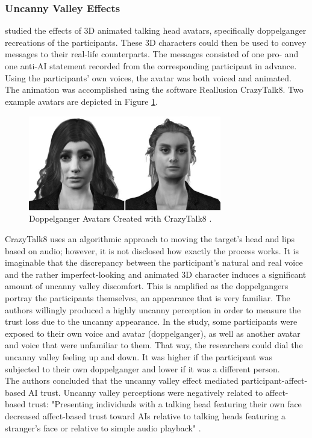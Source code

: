 \documentclass[
  a4paper,  %
  twoside,  %
  bibliography=totoc,
  headsepline,
  cleardoublepage=empty,
  parskip=half,
  draft=false
]{scrbook}
\begin{document}
\subsubsection*{Uncanny Valley Effects}
 studied the effects of 3D animated talking head avatars, specifically doppelganger recreations of the participants. These 3D characters could then be used to convey messages to their real-life counterparts. The messages consisted of one pro- and one anti-AI statement recorded from the corresponding participant in advance. Using the participants' own voices, the avatar was both voiced and animated. The animation was accomplished using the software Reallusion CrazyTalk8. Two example avatars are depicted in Figure \ref{fig:uncanny-avatars}.

\begin{figure}[h]
  \centering
  \includegraphics[width=0.75\textwidth]{./graphics/uncanny-avatars.png}
  \caption{Doppelganger Avatars Created with CrazyTalk8 \cite{weismanFaceUncannyEffects2021}.}
  \label{fig:uncanny-avatars}
\end{figure}

CrazyTalk8 uses an algorithmic approach to moving the target's head and lips based on audio; however, it is not disclosed how exactly the process works. It is imaginable that the discrepancy between the participant's natural and real voice and the rather imperfect-looking and animated 3D character induces a significant amount of uncanny valley discomfort. This is amplified as the doppelgangers portray the participants themselves, an appearance that is very familiar. The authors willingly produced a highly uncanny perception in order to measure the trust loss due to the uncanny appearance. In the study, some participants were exposed to their own voice and avatar (doppelganger), as well as another avatar and voice that were unfamiliar to them. That way, the researchers could dial the uncanny valley feeling up and down. It was higher if the participant was subjected to their own doppelganger and lower if it was a different person.\\
The authors concluded that the uncanny valley effect mediated participant-affect-based AI trust. Uncanny valley perceptions were negatively related to affect-based trust: "Presenting individuals with a talking head featuring their own face decreased affect-based trust toward AIs relative to talking heads featuring a stranger's face or relative to simple audio playback" \cite{weismanFaceUncannyEffects2021}.
\end{document}
